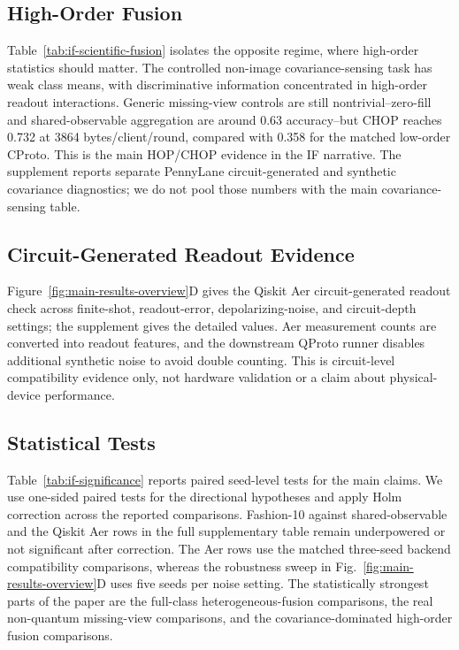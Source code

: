 \subsection{High-Order Fusion}



Table~\ref{tab:if-scientific-fusion} isolates the opposite regime, where high-order statistics should matter. The controlled non-image covariance-sensing task has weak class means, with discriminative information concentrated in high-order readout interactions. Generic missing-view controls are still nontrivial--zero-fill and shared-observable aggregation are around 0.63 accuracy--but CHOP reaches 0.732 at 3864 bytes/client/round, compared with 0.358 for the matched low-order CProto. This is the main HOP/CHOP evidence in the IF narrative. The supplement reports separate PennyLane circuit-generated and synthetic covariance diagnostics; we do not pool those numbers with the main covariance-sensing table.

\subsection{Circuit-Generated Readout Evidence}

Figure~\ref{fig:main-results-overview}D gives the Qiskit Aer circuit-generated readout check across finite-shot, readout-error, depolarizing-noise, and circuit-depth settings; the supplement gives the detailed values. Aer measurement counts are converted into readout features, and the downstream QProto runner disables additional synthetic noise to avoid double counting. This is circuit-level compatibility evidence only, not hardware validation or a claim about physical-device performance.

\subsection{Statistical Tests}



Table~\ref{tab:if-significance} reports paired seed-level tests for the main claims. We use one-sided paired tests for the directional hypotheses and apply Holm correction across the reported comparisons. Fashion-10 against shared-observable and the Qiskit Aer rows in the full supplementary table remain underpowered or not significant after correction. The Aer rows use the matched three-seed backend compatibility comparisons, whereas the robustness sweep in Fig.~\ref{fig:main-results-overview}D uses five seeds per noise setting. The statistically strongest parts of the paper are the full-class heterogeneous-fusion comparisons, the real non-quantum missing-view comparisons, and the covariance-dominated high-order fusion comparisons.
